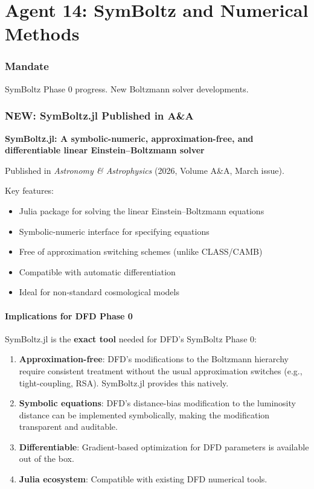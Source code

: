 \documentclass[11pt,a4paper]{article}
\newcommand{\NEW}{\textcolor{dfdblue}{\textbf{NEW}}}
\begin{document}
\part{Agent 14: SymBoltz and Numerical Methods}
\label{part:agent14}

\section{Mandate}

SymBoltz Phase 0 progress. New Boltzmann solver developments.

\section{\NEW: SymBoltz.jl Published in A\&A}

\begin{tcolorbox}[colback=green!5!white, colframe=green!60!black,
  title={MAJOR DEVELOPMENT: SymBoltz.jl Published}]
\textbf{SymBoltz.jl: A symbolic-numeric, approximation-free, and differentiable linear Einstein--Boltzmann solver}

Published in \emph{Astronomy \& Astrophysics} (2026, Volume A\&A, March issue).

Key features:
\begin{itemize}
\item Julia package for solving the linear Einstein--Boltzmann equations
\item Symbolic-numeric interface for specifying equations
\item Free of approximation switching schemes (unlike CLASS/CAMB)
\item Compatible with automatic differentiation
\item Ideal for non-standard cosmological models
\end{itemize}
\end{tcolorbox}

\subsection{Implications for DFD Phase 0}

SymBoltz.jl is the \textbf{exact tool} needed for DFD's SymBoltz Phase 0:
\begin{enumerate}
\item \textbf{Approximation-free}: DFD's modifications to the Boltzmann hierarchy require consistent treatment without the usual approximation switches (e.g., tight-coupling, RSA). SymBoltz.jl provides this natively.
\item \textbf{Symbolic equations}: DFD's distance-bias modification to the luminosity distance can be implemented symbolically, making the modification transparent and auditable.
\item \textbf{Differentiable}: Gradient-based optimization for DFD parameters is available out of the box.
\item \textbf{Julia ecosystem}: Compatible with existing DFD numerical tools.
\end{enumerate}
\end{document}
